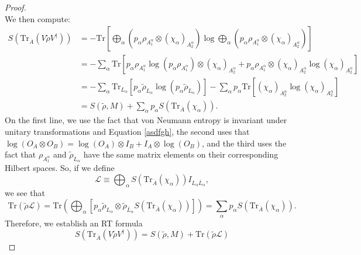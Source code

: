 \documentclass[12pt,a4paper]{report}
\numberwithin{equation}{section}
\newcommand{\ol}[1]{\overline{#1}}
\newcommand{\tr}{\text{Tr}}
\theoremstyle{definition}
\theoremstyle{theorem}
\theoremstyle{theorem}
\theoremstyle{example}
\theoremstyle{definition}
\begin{document}
\begin{proof}
\begin{equation}
	\end{equation}
	We then compute:
	\begin{equation}
		\begin{aligned}
			S\left(\tr_{\ol{A}}\left(V\tilde{\rho}V^{\dagger}\right)\right)&=-\tr\left[\bigoplus_{\alpha}\left(p_{\alpha}\rho_{A_{1}^{\alpha}}\otimes\left(\chi_{\alpha}\right)_{A_{2}^{\alpha}}\right)\log\bigoplus_{\alpha}\left(p_{\alpha}\rho_{A_{1}^{\alpha}}\otimes\left(\chi_{\alpha}\right)_{A_{2}^{\alpha}}\right)\right]\\
			&=-\sum_{\alpha}\tr\left[p_{\alpha}\rho_{A_{1}^{\alpha}}\log\left(p_{\alpha}\rho_{A_{1}^{\alpha}}\right)\otimes\left(\chi_{\alpha}\right)_{A_{2}^{\alpha}}+p_{\alpha}\rho_{A_{1}^{\alpha}}\otimes\left(\chi_{\alpha}\right)_{A_{2}^{\alpha}}\log\left(\chi_{\alpha}\right)_{A_{2}^{\alpha}}\right]\\
			&=-\sum_{\alpha}\tr_{L_{\alpha}}\left[p_{\alpha}\tilde{\rho}_{L_{\alpha}}\log\left(p_{\alpha}\tilde{\rho}_{L_{\alpha}}\right)\right]-\sum_{\alpha}p_{\alpha}\tr\left[\left(\chi_{\alpha}\right)_{A_{2}^{\alpha}}\log\left(\chi_{\alpha}\right)_{A_{2}^{\alpha}}\right]\\
			&=S(\tilde{\rho},M)+\sum_{\alpha}p_{\alpha}S\left(\tr_{\ol{A}}\left(\chi_{\alpha}\right)\right).
		\end{aligned}
	\end{equation}
	On the first line, we use the fact that von Neumann entropy is invariant under unitary transformations and Equation \ref{asdfgh}, the second uses that $\log(O_{A}\otimes O_{B})=\log(O_{A})\otimes I_{B}+I_{A}\otimes\log(O_{B})$, and the third uses the fact that $\rho_{A_{1}^{\alpha}}$ and $\tilde{\rho}_{L_{\alpha}}$ have the same matrix elements on their corresponding Hilbert spaces. So, if we define
	\begin{equation}
		\mathcal{L}\equiv \bigoplus_{\alpha}S\left(\tr_{\ol{A}}\left(\chi_{\alpha}\right)\right)I_{L_{\alpha}\ol{L}_{\alpha}},
	\end{equation}
	we see that
	\begin{equation}
		\tr\left(\tilde{\rho}\mathcal{L}\right)=\tr\left(\bigoplus_{\alpha}\left[p_{\alpha}\tilde{\rho}_{L_{\alpha}}\otimes\tilde{\rho}_{\ol{L}_{\alpha}}S\left(\tr_{\ol{A}}\left(\chi_{\alpha}\right)\right)\right]\right)=\sum_{\alpha}p_{\alpha}S\left(\tr_{\ol{A}}\left(\chi_{\alpha}\right)\right).
	\end{equation}
	Therefore, we establish an RT formula
	\begin{equation}\label{RTyay}
		S\left(\tr_{\ol{A}}\left(V\tilde{\rho}V^{\dagger}\right)\right)=S(\tilde{\rho},M)+\tr\left(\tilde{\rho}\mathcal{L}\right)

\end{equation}
\end{proof}
\end{document}
